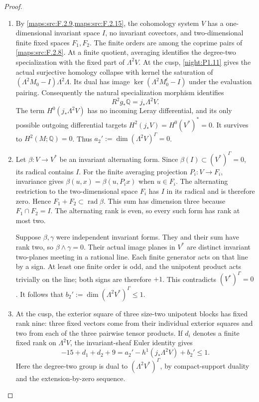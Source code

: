 \documentclass[11pt,a4paper]{article}
\theoremstyle{definition}
\begin{document}
\begin{proof}
\begin{enumerate}[label=\arabic*.]
\item By \cref{maps:src:F.2.9,maps:src:F.2.15}, the cohomology
system $V$ has a one-dimensional invariant space $I$, no invariant
covectors, and two-dimensional finite fixed spaces $F_1,F_2$.
The finite orders are among the coprime pairs of
\cref{maps:src:F.2.8}.  At a finite quotient, averaging identifies
the degree-two specialization with the fixed part of $\Lambda^2V$.
At the cusp, \cref{night:P1.11} gives the actual surjective homology
collapse with kernel the saturation of
$(\Lambda^2M_0-I)\Lambda^2\Lambda$.  Its dual has image
$\ker(\Lambda^2M_0^t-I)$ under the evaluation pairing.  Consequently
the natural specialization morphism identifies
\[
 R^2g_*\mathbb Q=j_*\Lambda^2V.
\]
The term $H^0(j_*\Lambda^2V)$ has no incoming Leray differential,
and its only possible outgoing differential targets
$H^2(j_*V)=H^0(V^*)^*=0$.  It survives to $H^2(M;\mathbb Q)=0$.
Thus $a_2':=\dim(\Lambda^2V)^\Gamma=0$.

\item Let $\beta:V\to V^*$ be an invariant alternating form.
Since $\beta(I)\subset(V^*)^\Gamma=0$, its radical contains $I$.
For the finite averaging projection $P_i:V\to F_i$, invariance gives
$\beta(u,x)=\beta(u,P_ix)$ when $u\in F_i$.
The alternating restriction to the two-dimensional space $F_i$
has $I$ in its radical and is therefore zero.  Hence
$F_1+F_2\subset\operatorname{rad}\beta$.  This sum has dimension
three because $F_1\cap F_2=I$.  The alternating rank is even,
so every such form has rank at most two.

Suppose $\beta,\gamma$ were independent invariant forms.
They and their sum have rank two, so
$\beta\wedge\gamma=0$.  Their actual image planes in $V^*$
are distinct invariant two-planes meeting in a rational line.
Each finite generator acts on that line by a sign.  At least one
finite order is odd, and the unipotent product acts trivially on the
line; both signs are therefore $+1$.  This contradicts
$(V^*)^\Gamma=0$.  It follows that
$b_2':=\dim(\Lambda^2V^*)^\Gamma\leq1$.

\item At the cusp, the exterior square of three size-two unipotent
blocks has fixed rank nine: three fixed vectors come from their
individual exterior squares and two from each of the three pairwise
tensor products.  If $d_i$ denotes a finite fixed rank on
$\Lambda^2V$, the invariant-sheaf Euler identity gives
\[
 -15+d_1+d_2+9
 =a_2'-h^1(j_*\Lambda^2V)+b_2'\leq1.
 \tag{F.40}\label{maps:eq:F.40}
\]
Here the degree-two group is dual to
$(\Lambda^2V^*)^\Gamma$, by compact-support duality and the
extension-by-zero sequence.


\end{enumerate}
\end{proof}
\end{document}

